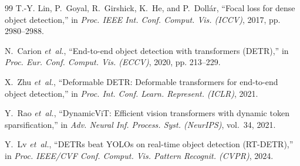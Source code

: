 \documentclass[11pt,a4paper]{article}
\begin{document}
\begin{thebibliography}{99}
T.-Y. Lin, P.~Goyal, R.~Girshick, K.~He, and P.~Doll{\'a}r, ``Focal loss for dense object detection,'' in \emph{Proc. IEEE Int. Conf. Comput. Vis. (ICCV)}, 2017, pp. 2980--2988.

N.~Carion \emph{et~al.}, ``End-to-end object detection with transformers (DETR),'' in \emph{Proc. Eur. Conf. Comput. Vis. (ECCV)}, 2020, pp. 213--229.

X.~Zhu \emph{et~al.}, ``Deformable DETR: Deformable transformers for end-to-end object detection,'' in \emph{Proc. Int. Conf. Learn. Represent. (ICLR)}, 2021.

Y.~Rao \emph{et~al.}, ``DynamicViT: Efficient vision transformers with dynamic token sparsification,'' in \emph{Adv. Neural Inf. Process. Syst. (NeurIPS)}, vol.~34, 2021.

Y.~Lv \emph{et~al.}, ``DETRs beat YOLOs on real-time object detection (RT-DETR),'' in \emph{Proc. IEEE/CVF Conf. Comput. Vis. Pattern Recognit. (CVPR)}, 2024.

\end{thebibliography}
\endgroup
\end{document}
